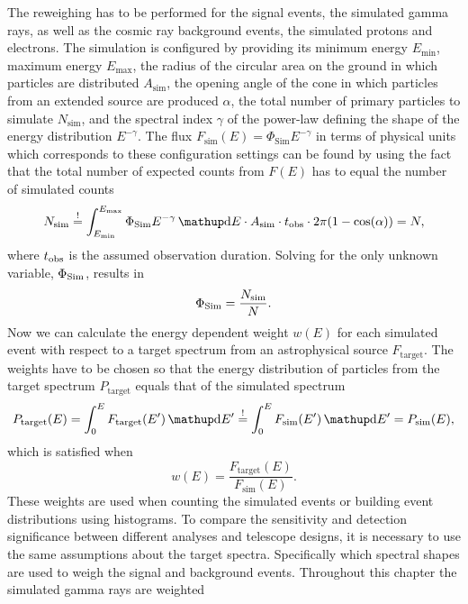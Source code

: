 The reweighing has to be performed for the signal events, the simulated gamma rays, as well as the cosmic ray background events, the simulated protons and electrons.
The \corsika simulation is configured by providing its minimum energy $E_\text{min}$, maximum energy $E_\text{max}$, the radius of the circular area on the ground in which
particles are distributed $A_\text{sim}$, the opening angle of the cone in which particles from an extended source are produced $\alpha$, the total 
number of primary particles to simulate $N_\text{sim}$, and the spectral index $\gamma$
of the power-law defining the shape of the energy distribution $E^{-\gamma}$. 
The flux $F_\text{sim}(E) = \Phi_{\text{Sim}} E^{-\gamma}$ in terms of physical units which corresponds to these configuration settings can be found by using the fact that 
the total number of expected counts from $F(E)$ has to equal the number of simulated counts
\begin{equation*}
    N_\text{sim} \stackrel{!}{=} \int_{\emin}^{\emax} \phisim E^{-\gamma} \diff{E} \cdot \asim \cdot \tobs \cdot 2\pi(1 - \cos(\alpha)) = N,
\end{equation*}
where $t_{\text{obs}}$ is the assumed observation duration. Solving for the only unknown variable, $\Phi_{\text{Sim}}$, results in 
\begin{equation*}
    \Phi_{\text{Sim}} = \frac{N_\text{sim}}{N}.
\end{equation*}
Now we can calculate the energy dependent weight $w(E)$ for each simulated event with respect to a target spectrum from an astrophysical source $F_\text{target}$.
The weights have to be chosen so that the energy distribution of particles from the target spectrum $P_\text{target}$ equals that of the 
simulated spectrum
\begin{equation*}
    P_\text{target}(E) = \int_{0}^{E} F_\text{target} (E') \diff{E'} \stackrel{!}{=} \int_{0}^{E} F_\text{sim} (E') \diff{E'} = P_\text{sim}(E),
\end{equation*}
which is satisfied when 
\begin{equation}
    w(E) = \frac{F_\text{target}(E)}{F_\text{sim}(E)}.
\end{equation}
These weights are used when counting the simulated events or building event distributions using histograms. To compare the sensitivity and detection significance between different analyses and 
telescope designs, it is necessary to use the same assumptions about the target spectra. Specifically which spectral shapes are used to weigh the 
signal and background events. 
Throughout this chapter the simulated gamma rays are weighted 
